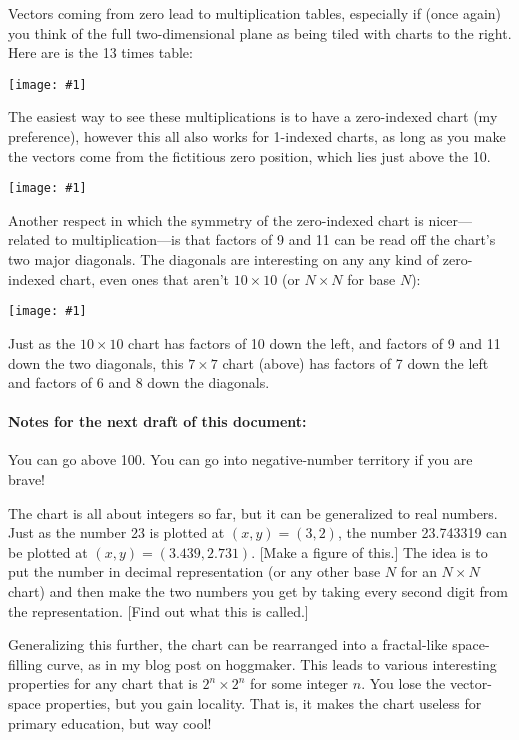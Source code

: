 \documentclass[12pt,pdftex]{article}
\newcommand{\showchart}[1]{\texttt{[image: \#1]}}
\begin{document}
Vectors coming from zero lead to multiplication tables, especially if
(once again) you think of the full two-dimensional plane as being
tiled with charts to the right.  Here are is the 13 times table:
\begin{center}
\showchart{hundreds_chart_tr_13s.pdf}
\end{center}
The easiest way to see these
multiplications is to have a zero-indexed chart (my preference),
however this all also works for 1-indexed charts, as long as you make
the vectors come from the fictitious zero position, which lies just
above the 10.
\begin{center}
\showchart{hundreds_chart_tr_index1_13s.pdf}
\end{center}

Another respect in which the symmetry of the zero-indexed chart is
nicer---related to multiplication---is that factors of 9 and 11 can be
read off the chart's two major diagonals.  The diagonals are
interesting on any any kind of zero-indexed chart, even ones that
aren't $10\times 10$ (or $N\times N$ for base $N$):
\begin{center}
\showchart{hundreds_chart_7x7_base10.pdf}
\end{center}
Just as the $10\times 10$ chart has factors of 10 down the left, and
factors of 9 and 11 down the two diagonals, this $7\times 7$ chart
(above) has factors of 7 down the left and factors of 6 and 8 down the
diagonals.

\paragraph{Notes for the next draft of this document:}
You can go above 100.  You can go into negative-number territory if
you are brave!

The chart is all about integers so far, but it can be generalized to
real numbers.  Just as the number 23 is plotted at $(x,y) = (3,2)$,
the number 23.743319 can be plotted at $(x,y) = (3.439, 2.731)$.
[Make a figure of this.]  The idea is to put the number in decimal
representation (or any other base $N$ for an $N\times N$ chart) and
then make the two numbers you get by taking every second digit from
the representation.  [Find out what this is called.]

Generalizing this further, the chart can be rearranged into a
fractal-like space-filling curve, as in my blog post on hoggmaker.
This leads to various interesting properties for any chart that is
$2^n\times 2^n$ for some integer $n$.  You lose the vector-space
properties, but you gain locality.  That is, it makes the chart
useless for primary education, but way cool!
\end{document}
